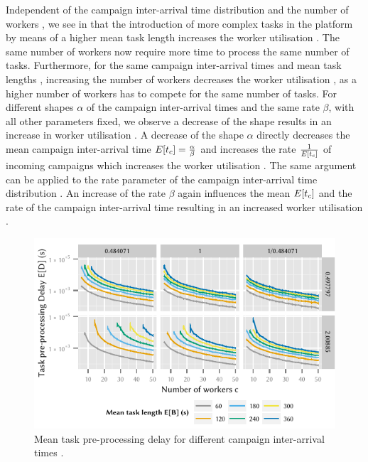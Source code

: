 Independent of the campaign inter-arrival time distribution \campaignIAT and the number of workers \numberOfWorkers, we see in  that the introduction of more complex tasks in the platform by means of a higher mean task length \meanTaskLength increases the worker utilisation \workerUtilization.
The same number of workers \numberOfWorkers now require more time to process the same number of tasks.
Furthermore, for the same campaign inter-arrival times \campaignIAT and mean task lengths \meanTaskLength, increasing the number of workers \numberOfWorkers decreases the worker utilisation \workerUtilization, as a higher number of workers has to compete for the same number of tasks.
For different shapes \(\alpha\) of the campaign inter-arrival times \campaignIAT and the same rate \(\beta\), with all other parameters fixed, we observe a decrease of the shape results in an increase in worker utilisation \workerUtilization.
A decrease of the shape \(\alpha\) directly decreases the mean campaign inter-arrival time \(E[t_c]=\frac{\alpha}{\beta}\) and increases the rate \(\frac{1}{E[t_c]}\) of incoming campaigns which increases the worker utilisation \workerUtilization. 
The same argument can be applied to the rate parameter of the campaign inter-arrival time distribution \campaignIAT.
An increase of the rate \(\beta\) again influences the mean \(E[t_c]\) and the rate of the campaign inter-arrival time \campaignIAT resulting in an increased worker utilisation \workerUtilization.

\begin{figure}
	\centering
	\includegraphics{cloud/crowdsourcing/numerical_evaluation/figures/parameter_task_delay}
	\caption{Mean task pre-processing delay \preTaskProcessingDelay for different campaign inter-arrival times \campaignIAT.}
	\label{fig:cloud:crowdsourcing:performance_evaluation:distributions:parameter_task_delay}
\end{figure}

